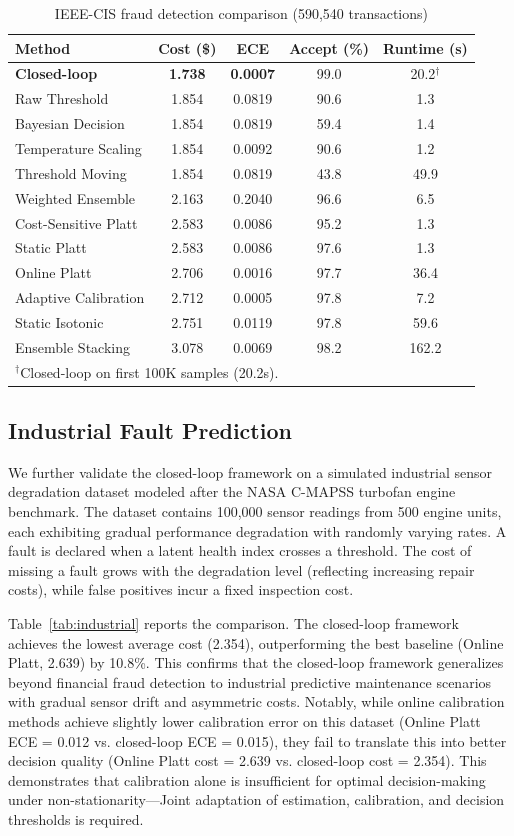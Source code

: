 \documentclass[12pt,a4paper]{article}
\begin{document}
\begin{table}[h]
\centering
\caption{IEEE-CIS fraud detection comparison (590,540 transactions)}
\label{tab:fraud_full}
\begin{tabular}{lcccc}
\toprule
Method & Cost (\$) & ECE & Accept (\%) & Runtime (s) \\
\midrule
\textbf{Closed-loop} & \textbf{1.738} & \textbf{0.0007} & 99.0 & 20.2$^\dagger$ \\
Raw Threshold & 1.854 & 0.0819 & 90.6 & 1.3 \\
Bayesian Decision & 1.854 & 0.0819 & 59.4 & 1.4 \\
Temperature Scaling & 1.854 & 0.0092 & 90.6 & 1.2 \\
Threshold Moving & 1.854 & 0.0819 & 43.8 & 49.9 \\
Weighted Ensemble & 2.163 & 0.2040 & 96.6 & 6.5 \\
Cost-Sensitive Platt & 2.583 & 0.0086 & 95.2 & 1.3 \\
Static Platt & 2.583 & 0.0086 & 97.6 & 1.3 \\
Online Platt & 2.706 & 0.0016 & 97.7 & 36.4 \\
Adaptive Calibration & 2.712 & 0.0005 & 97.8 & 7.2 \\
Static Isotonic & 2.751 & 0.0119 & 97.8 & 59.6 \\
Ensemble Stacking & 3.078 & 0.0069 & 98.2 & 162.2 \\
\bottomrule
\multicolumn{5}{l}{$^\dagger$Closed-loop on first 100K samples (20.2s).}
\end{tabular}
\end{table}

\subsection{Industrial Fault Prediction}

We further validate the closed-loop framework on a simulated industrial sensor degradation dataset
modeled after the NASA C-MAPSS turbofan engine benchmark. The dataset contains 100,000 sensor readings
from 500 engine units, each exhibiting gradual performance degradation with randomly varying rates.
A fault is declared when a latent health index crosses a threshold. The cost of missing a fault
grows with the degradation level (reflecting increasing repair costs), while false positives incur
a fixed inspection cost.

Table~\ref{tab:industrial} reports the comparison. The closed-loop framework achieves the lowest
average cost (2.354), outperforming the best baseline (Online Platt, 2.639) by 10.8\%.
This confirms that the closed-loop framework generalizes beyond financial fraud detection to industrial predictive maintenance scenarios with gradual sensor drift and asymmetric costs.
Notably, while online calibration methods achieve slightly lower calibration error on this dataset (Online Platt ECE = 0.012 vs. closed-loop ECE = 0.015), they fail to translate this into better decision quality (Online Platt cost = 2.639 vs. closed-loop cost = 2.354).
This demonstrates that calibration alone is insufficient for optimal decision-making under non-stationarity---Joint adaptation of estimation, calibration, and decision thresholds is required.
\end{document}
